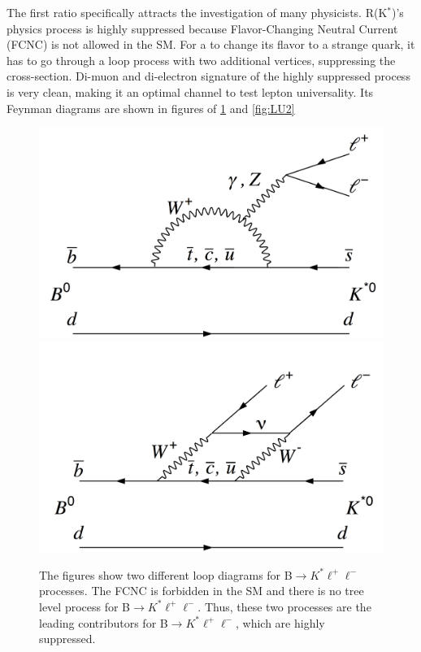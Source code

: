 The first ratio specifically attracts the investigation of many physicists.
R(K$^{*}$)'s physics process is highly suppressed because Flavor-Changing Neutral Current (FCNC) is not allowed in the SM.
For a \PQb to change its flavor to a strange quark, it has to go through a loop process with two additional vertices, suppressing the cross-section.
Di-muon and di-electron signature of the highly suppressed process is very clean, making it an optimal channel to test lepton universality.
Its Feynman diagrams are shown in figures of \ref{fig:LU1} and \ref{fig:LU2}
\begin{figure}[h!]
  \label{fig:LU1}
  \centering
  \includegraphics[width=0.57\linewidth]{figs/Fig1a.png}
  \includegraphics[width=0.57\linewidth]{figs/Fig1b.png}
	\caption{The figures show two different loop diagrams for B$\to K^{*}\ell^{+}\ell^{-}$ processes. The FCNC is forbidden in the SM and there is no tree level process for B$\to K^{*}\ell^{+}\ell^{-}$. Thus, these two processes are the leading contributors for B$\to K^{*}\ell^{+}\ell^{-}$, which are highly suppressed.\cite{Lep:2017aai}}
\end{figure}
